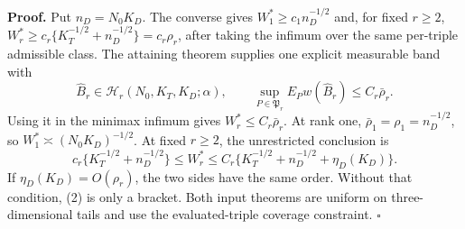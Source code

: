 \textbf{Proof.}
Put \(n_D=N_0K_D\). The converse gives \(W_1^*\ge c_1n_D^{-1/2}\) and, for fixed \(r\ge2\), \(W_r^*\ge c_r\{K_T^{-1/2}+n_D^{-1/2}\}=c_r\rho_r\), after taking the infimum over the same per-triple admissible class. The attaining theorem supplies one explicit measurable band with
\[
 \widehat B_r\in\mathcal H_r(N_0,K_T,K_D;\alpha),
 \qquad \sup_{P\in\mathfrak P_r}E_Pw(\widehat B_r)\le C_r\bar\rho_r. \tag{1}
\]
Using it in the minimax infimum gives \(W_r^*\le C_r\bar\rho_r\). At rank one, \(\bar\rho_1=\rho_1=n_D^{-1/2}\), so \(W_1^*\asymp(N_0K_D)^{-1/2}\). At fixed \(r\ge2\), the unrestricted conclusion is
\[
 c_r\{K_T^{-1/2}+n_D^{-1/2}\}
 \le W_r^*\le C_r\{K_T^{-1/2}+n_D^{-1/2}+\eta_D(K_D)\}.   \tag{2}
\]
If \(\eta_D(K_D)=O(\rho_r)\), the two sides have the same order. Without that condition, (2) is only a bracket. Both input theorems are uniform on three-dimensional tails and use the evaluated-triple coverage constraint. \(\square\)